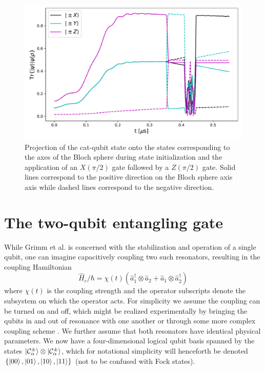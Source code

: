 \begin{figure}[t]
    \centering
    \includegraphics[width=\columnwidth]{figures/bloch.pdf}
    \caption{Projection of the cat-qubit state onto the states corresponding to the axes of the Bloch sphere during state initialization and the application of an $X(\pi/2)$ gate followed by a $Z(\pi/2)$ gate. Solid lines correspond to the positive direction on the Bloch sphere axis axis while dashed lines correspond to the negative direction.}
    \label{fig:bloch}
\end{figure}

\section{\label{sec:two_qubit} The two-qubit entangling gate}

While Grimm et al. \cite{grimm_2020} is concerned with the stabilization and operation of a single qubit, one can imagine capacitively coupling two such resonators, resulting in the coupling Hamiltonian
\begin{equation}
    \hat{H}_c / \hbar = \chi(t) (\hat{a}_1^\dag \otimes \hat{a}_2 + \hat{a}_1 \otimes \hat{a}_2^\dag)
\end{equation}
where $\chi(t)$ is the coupling strength and the operator subscripts denote the subsystem on which the operator acts.
For simplicity we assume the coupling can be turned on and off, which might be realized experimentally by bringing the qubits in and out of resonance with one another or through some more complex coupling scheme \cite{wendin_2017}.
We further assume that both resonators have identical physical parameters.
We now have a four-dimensional logical qubit basis spanned by the states $\ket{\mathcal{C}_\alpha^\pm} \otimes \ket{\mathcal{C}_\alpha^\pm}$, which for notational simplicity will henceforth be denoted $\{\ket{00}, \ket{01}, \ket{10}, \ket{11}  \}$ (not to be confused with Fock states).

